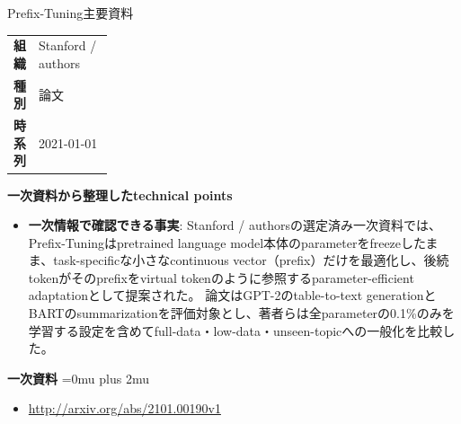 \begin{technicalnote}{Prefix-Tuning}{主要資料}
\begingroup
\begin{tabularx}{\linewidth}{@{}>{\bfseries}p{0.22\linewidth}X@{}}
組織 & Stanford / authors \\
種別 & 論文 \\
時系列 & 2021-01-01 \\
\end{tabularx}
\smallskip
\begin{minipage}{\linewidth}
{\bfseries 一次資料から整理したtechnical points}
\begin{itemize}[leftmargin=1.5em,itemsep=0.35em]
\item \textbf{一次情報で確認できる事実}: Stanford / authorsの選定済み一次資料では、Prefix-Tuningはpretrained language model本体のparameterをfreezeしたまま、task-specificな小さなcontinuous vector（prefix）だけを最適化し、後続tokenがそのprefixをvirtual tokenのように参照するparameter-efficient adaptationとして提案された。 論文はGPT-2のtable-to-text generationとBARTのsummarizationを評価対象とし、著者らは全parameterの0.1\%のみを学習する設定を含めてfull-data・low-data・unseen-topicへの一般化を比較した。
\end{itemize}
\begin{minipage}{\linewidth}
\begin{samepage}
{\bfseries 一次資料}
\begingroup\sloppy
\Urlmuskip=0mu plus 2mu\relax
\begin{itemize}[leftmargin=1.5em,itemsep=0.25em]
\item {\scriptsize\url{http://arxiv.org/abs/2101.00190v1}}
\end{itemize}
\endgroup
\end{samepage}
\end{minipage}
\end{minipage}
\endgroup
\end{technicalnote}
\medskip

